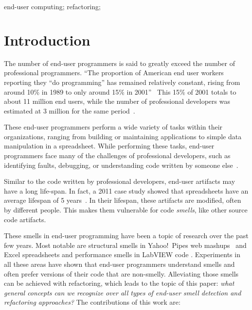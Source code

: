 \documentclass[10pt,conference,compsocconf]{IEEEtran}
\begin{document}
\begin{IEEEkeywords}
end-user computing; refactoring; 
\end{IEEEkeywords}

\section{Introduction}
The number of end-user programmers is said to greatly exceed the number of professional programmers. ``The proportion of American end user workers reporting they ``do programming'' has remained relatively constant, rising from around 10\% in 1989 to only around 15\% in 2001''~\cite{Scaf2005} This 15\% of 2001 totals to about 11 million end users, while the number of professional developers was estimated at 3 million for the same period~\cite{Scaf2005}.

These end-user programmers perform a wide variety of tasks within their organizations, ranging from building or maintaining applications to simple data manipulation in a spreadsheet. While performing these tasks, end-user programmers face many of the challenges of professional developers, such as identifying faults, debugging, or understanding code written by someone else~\cite{Ko2011}.

Similar to the code written by professional developers, end-user artifacts may have a long life-span. In fact, a 2011 case study showed that spreadsheets have an average lifespan of 5 years~\cite{Hermans2011}. In their lifespan, these artifacts are modified, often by different people. This makes them vulnerable for code \emph{smells}, like other source code artifacts. 

These smells in end-user programming have been a topic of research over the past few years. Most notable are structural smells in Yahoo!\ Pipes web mashups~\cite{Stolee2011} and  Excel spreadsheets \cite{Hermans2012inter} and performance smells in LabVIEW code \cite{chambers2013smell}. Experiments in all these areas have shown that end-user programmers understand smells and often prefer versions of their code that are non-smelly. Alleviating those smells can be achieved with refactoring, which leads to the topic of this paper: \emph{what general concepts can we recognize over all types of end-user smell detection and refactoring approaches?}  The contributions of this work are:
\end{document}
